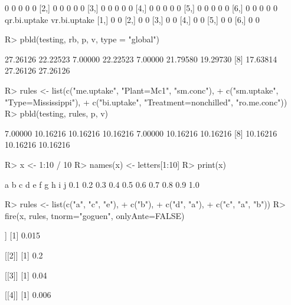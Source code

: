 \documentclass{article}\usepackage[]{graphicx}\usepackage[]{color}
\begin{document}
\begin{Schunk}
\begin{Soutput}
[1,]            0            0         0            0            0
[2,]            0            0         0            0            0
[3,]            0            0         0            0            0
[4,]            0            0         0            0            0
[5,]            0            0         0            0            0
[6,]            0            0         0            0            0
     qr.bi.uptake vr.bi.uptake
[1,]            0            0
[2,]            0            0
[3,]            0            0
[4,]            0            0
[5,]            0            0
[6,]            0            0
\end{Soutput}
%
% --end: "pbld5"
\end{Schunk}

\begin{Schunk}
% --begin: "pbld6"
\begin{Sinput}
R> pbld(testing, rb, p, v, type = "global")
\end{Sinput}
\begin{Soutput}
 [1] 27.26126 22.22523  7.00000 22.22523  7.00000 21.79580 19.29730
 [8] 17.63814 27.26126 27.26126
\end{Soutput}
%
% --end: "pbld6"
\end{Schunk}

\begin{Schunk}
% --begin: "pbld_custom"
\begin{Sinput}
R> rules <- list(c("me.uptake", "Plant=Mc1", "sm.conc"),
+                c("sm.uptake", "Type=Mississippi"),
+                c("bi.uptake", "Treatment=nonchilled", "ro.me.conc"))
R> pbld(testing, rules, p, v)
\end{Sinput}
\begin{Soutput}
 [1]  7.00000 10.16216 10.16216 10.16216  7.00000 10.16216 10.16216
 [8] 10.16216 10.16216 10.16216
\end{Soutput}
%
% --end: "pbld_custom"
\end{Schunk}

\begin{Schunk}
% --begin: "fire"
\begin{Sinput}
R> x <- 1:10 / 10
R> names(x) <- letters[1:10]
R> print(x)
\end{Sinput}
\begin{Soutput}
  a   b   c   d   e   f   g   h   i   j 
0.1 0.2 0.3 0.4 0.5 0.6 0.7 0.8 0.9 1.0 
\end{Soutput}
\begin{Sinput}
R> rules <- list(c("a", "c", "e"),
+                c("b"),
+                c("d", "a"),
+                c("c", "a", "b"))
R> fire(x, rules, tnorm="goguen", onlyAnte=FALSE)
\end{Sinput}
\begin{Soutput}
[[1]]
[1] 0.015

[[2]]
[1] 0.2

[[3]]
[1] 0.04

[[4]]
[1] 0.006
\end{Soutput}
%
% --end: "fire"
\end{Schunk}
\end{document}
